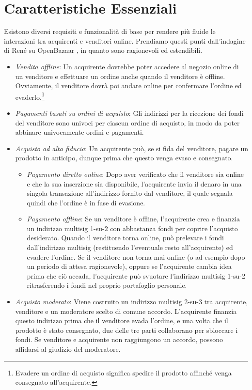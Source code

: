 \section{Caratteristiche Essenziali}
\label{sec:escrowed-marketplace-essential-features}

Esistono diversi requisiti e funzionalità di base per rendere più fluide le interazioni tra acquirenti e venditori online. Prendiamo questi punti dall'indagine di Ren\'e su OpenBazaar \cite{openbazaar-rbrunner-investigation}, in quanto sono ragionevoli ed estendibili.
\begin{itemize}
    \item {\em Vendita offline}: Un acquirente dovrebbe poter accedere al negozio online di un venditore e effettuare un ordine anche quando il venditore è offline. Ovviamente, il venditore dovrà poi andare online per confermare l'ordine ed evaderlo.\footnote{Evadere un ordine di acquisto significa spedire il prodotto affinché venga consegnato all'acquirente.}
    \item {\em Pagamenti basati su ordini di acquisto}: Gli indirizzi per la ricezione dei fondi del venditore sono univoci per ciascun ordine di acquisto, in modo da poter abbinare univocamente ordini e pagamenti.
    \item {\em Acquisto ad alta fiducia}: Un acquirente può, se si fida del venditore, pagare un prodotto in anticipo, dunque prima che questo venga evaso e consegnato.
    \begin{itemize}
        \item {\em Pagamento diretto online}: Dopo aver verificato che il venditore sia online e che la sua inserzione sia disponibile, l'acquirente invia il denaro in una singola transazione all'indirizzo fornito dal venditore, il quale segnala quindi che l'ordine è in fase di evasione.
        \item {\em Pagamento offline}: Se un venditore è offline, l'acquirente crea e finanzia un indirizzo multisig 1-su-2 con abbastanza fondi per coprire l'acquisto desiderato. Quando il venditore torna online, può prelevare i fondi dall'indirizzo multisig (restituendo l'eventuale resto all'acquirente) ed evadere l'ordine. Se il venditore non torna mai online (o ad esempio dopo un periodo di attesa ragionevole), oppure se l'acquirente cambia idea prima che ciò accada, l'acquirente può svuotare l'indirizzo multisig 1-su-2 ritrasferendo i fondi nel proprio portafoglio personale.
    \end{itemize}{}
    \item {\em Acquisto moderato}: Viene costruito un indirizzo multisig 2-su-3 tra acquirente, venditore e un moderatore scelto di comune accordo. L'acquirente finanzia questo indirizzo prima che il venditore evada l'ordine, e una volta che il prodotto è stato consegnato, due delle tre parti collaborano per sbloccare i fondi. Se venditore e acquirente non raggiungono un accordo, possono affidarsi al giudizio del moderatore.
\end{itemize}


